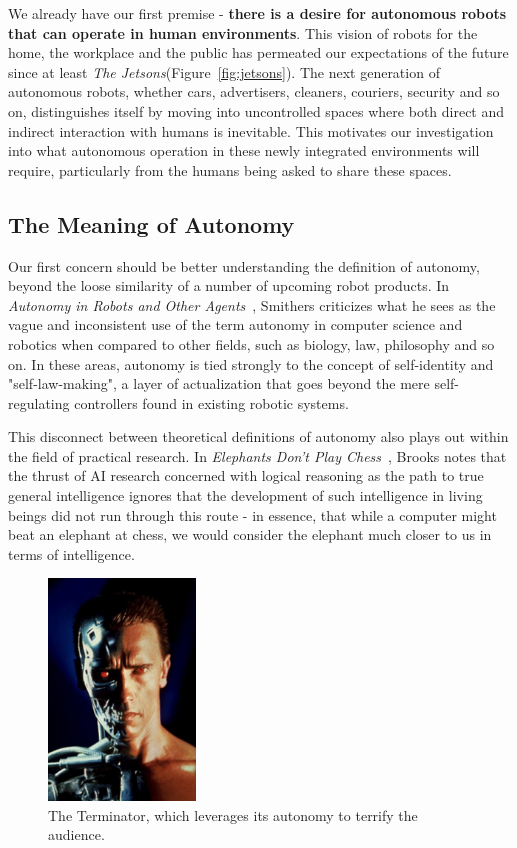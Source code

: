 \documentclass{sfuthesis}
\begin{document}
We already have our first premise - \textbf{there is a desire for autonomous robots that can operate in human environments}. This vision of robots for the home, the workplace and the public has permeated our expectations of the future since at least \textit{The Jetsons}(Figure~\ref{fig:jetsons}). The next generation of autonomous robots, whether cars, advertisers, cleaners, couriers, security and so on, distinguishes itself by moving into uncontrolled spaces where both direct and indirect interaction with humans is inevitable. This motivates our investigation into what autonomous operation in these newly integrated environments will require, particularly from the humans being asked to share these spaces.

\subsection{The Meaning of Autonomy}

Our first concern should be better understanding the definition of autonomy, beyond the loose similarity of a number of upcoming robot products. In \textit{Autonomy in Robots and Other Agents}~\cite{smithers1997autonomy}, Smithers criticizes what he sees as the vague and inconsistent use of the term autonomy in computer science and robotics when compared to other fields, such as biology, law, philosophy and so on. In these areas, autonomy is tied strongly to the concept of self-identity and "self-law-making", a layer of actualization that goes beyond the mere self-regulating controllers found in existing robotic systems. 

This disconnect between theoretical definitions of autonomy also plays out within the field of practical research. In \textit{Elephants Don't Play Chess}~\cite{brooks1990elephants}, Brooks notes that the thrust of AI research concerned with logical reasoning as the path to true general intelligence ignores that the development of such intelligence in living beings did not run through this route - in essence, that while a computer might beat an elephant at chess, we would consider the elephant much closer to us in terms of intelligence.

\begin{figure}[!b]
    \centering
    \includegraphics[width=0.35\textwidth]{terminator.png} 

    \caption{The Terminator, which leverages its autonomy to terrify the audience.}
    \label{fig:terminator}
\end{figure}
\end{document}
